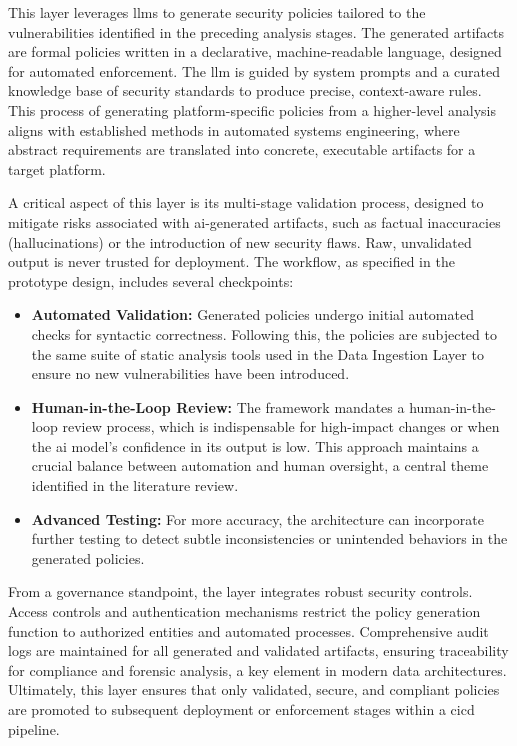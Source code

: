 This layer leverages \glspl{llm} to generate security policies tailored to the vulnerabilities identified in the preceding analysis stages. The generated artifacts are formal policies written in a declarative, machine-readable language, designed for automated enforcement. The \gls{llm} is guided by system prompts and a curated knowledge base of security standards to produce precise, context-aware rules. This process of generating platform-specific policies from a higher-level analysis aligns with established methods in automated systems engineering, where abstract requirements are translated into concrete, executable artifacts for a target platform\cite{chen_platform-specific_code_2025}.

A critical aspect of this layer is its multi-stage validation process, designed to mitigate risks associated with \gls{ai}-generated artifacts, such as factual inaccuracies (hallucinations) or the introduction of new security flaws\cite{kumar_generative_nodate}. Raw, unvalidated output is never trusted for deployment. The workflow, as specified in the prototype design, includes several checkpoints:

\begin{itemize}
\item \textbf{Automated Validation:} Generated policies undergo initial automated checks for syntactic correctness. Following this, the policies are subjected to the same suite of static analysis tools used in the Data Ingestion Layer to ensure no new vulnerabilities have been introduced.
\item \textbf{Human-in-the-Loop Review:} The framework mandates a human-in-the-loop review process, which is indispensable for high-impact changes or when the \gls{ai} model's confidence in its output is low. This approach maintains a crucial balance between automation and human oversight, a central theme identified in the literature review.
\item \textbf{Advanced Testing:} For more accuracy, the architecture can incorporate further testing to detect subtle inconsistencies or unintended behaviors in the generated policies.
\end{itemize}

From a governance standpoint, the layer integrates robust security controls. Access controls and authentication mechanisms restrict the policy generation function to authorized entities and automated processes. Comprehensive audit logs are maintained for all generated and validated artifacts, ensuring traceability for compliance and forensic analysis, a key element in modern data architectures\cite{ismail_big_2025-1}. Ultimately, this layer ensures that only validated, secure, and compliant policies are promoted to subsequent deployment or enforcement stages within a \gls{cicd} pipeline.


